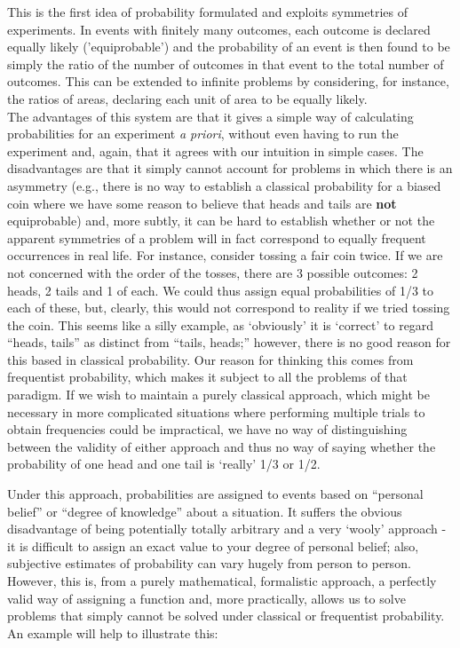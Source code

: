 \documentclass[12pt,a4paper]{article}
\begin{document}
This is the first idea of probability formulated and exploits symmetries of experiments. In events with finitely many outcomes, each outcome is declared equally likely ('equiprobable') and the probability of an event is then found to be simply the ratio of the number of outcomes in that event to the total number of outcomes. This can be extended to infinite problems by considering, for instance, the ratios of areas, declaring each unit of area to be equally likely.\\
\indent The advantages of this system are that it gives a simple way of calculating probabilities for an experiment {\it a priori}, without even having to run the experiment and, again, that it agrees with our intuition in simple cases. The disadvantages are that it simply cannot account for problems in which there is an asymmetry (e.g., there is no way to establish a classical probability for a biased coin where we have some reason to believe that heads and tails are {\bf not} equiprobable) and, more subtly, it can be hard to establish whether or not the apparent symmetries of a problem will in fact correspond to equally frequent occurrences in real life. For instance, consider tossing a fair coin twice. If we are not concerned with the order of the tosses, there are 3 possible outcomes: 2 heads, 2 tails and 1 of each. We could thus assign equal probabilities of 1/3 to each of these, but, clearly, this would not correspond to reality if we tried tossing the coin. This seems like a silly example, as `obviously' it is `correct' to regard ``heads, tails'' as distinct from ``tails, heads;'' however, there is no good reason for this based in classical probability. Our reason for thinking this comes from frequentist probability, which makes it subject to all the problems of that paradigm. If we wish to maintain a purely classical approach, which might be necessary in more complicated situations where performing multiple trials to obtain frequencies could be impractical, we have no way of distinguishing between the validity of either approach and thus no way of saying whether the probability of one head and one tail is `really' 1/3 or 1/2.\par
\vspace{12pt}

\par
\vspace{12pt}

Under this approach, probabilities are assigned to events based on ``personal belief'' or ``degree of knowledge'' about a situation. It suffers the obvious disadvantage of being potentially totally arbitrary and a very `wooly' approach - it is difficult to assign an exact value to your degree of personal belief; also, subjective estimates of probability can vary hugely from person to person. However, this is, from a purely mathematical, formalistic approach, a perfectly valid way of assigning a function and, more practically, allows us to solve problems that simply cannot be solved under classical or frequentist probability. An example will help to illustrate this:
\end{document}

